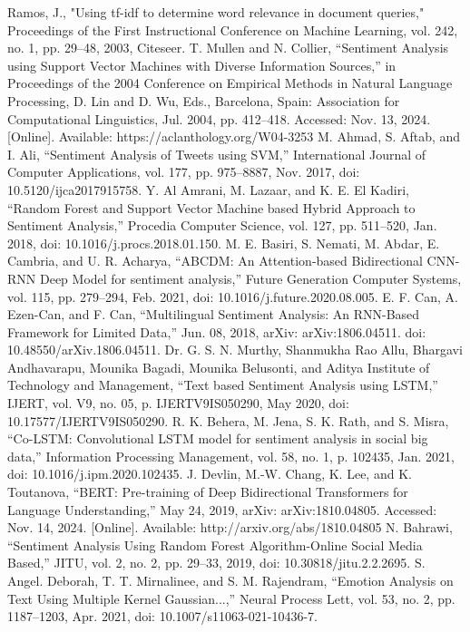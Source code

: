\documentclass{article}
\begin{document}

\begin{thebibliography}{99}  
Ramos, J., "Using tf-idf to determine word relevance in document queries," Proceedings of the First Instructional Conference on Machine Learning, vol. 242, no. 1, pp. 29–48, 2003, Citeseer.
T. Mullen and N. Collier, “Sentiment Analysis using Support Vector Machines with Diverse Information Sources,” in Proceedings of the 2004 Conference on Empirical Methods in Natural Language Processing, D. Lin and D. Wu, Eds., Barcelona, Spain: Association for Computational Linguistics, Jul. 2004, pp. 412–418. Accessed: Nov. 13, 2024. [Online]. Available: https://aclanthology.org/W04-3253
M. Ahmad, S. Aftab, and I. Ali, “Sentiment Analysis of Tweets using SVM,” International Journal of Computer Applications, vol. 177, pp. 975–8887, Nov. 2017, doi: 10.5120/ijca2017915758.
Y. Al Amrani, M. Lazaar, and K. E. El Kadiri, “Random Forest and Support Vector Machine based Hybrid Approach to Sentiment Analysis,” Procedia Computer Science, vol. 127, pp. 511–520, Jan. 2018, doi: 10.1016/j.procs.2018.01.150.
M. E. Basiri, S. Nemati, M. Abdar, E. Cambria, and U. R. Acharya, “ABCDM: An Attention-based Bidirectional CNN-RNN Deep Model for sentiment analysis,” Future Generation Computer Systems, vol. 115, pp. 279–294, Feb. 2021, doi: 10.1016/j.future.2020.08.005.
E. F. Can, A. Ezen-Can, and F. Can, “Multilingual Sentiment Analysis: An RNN-Based Framework for Limited Data,” Jun. 08, 2018, arXiv: arXiv:1806.04511. doi: 10.48550/arXiv.1806.04511.
Dr. G. S. N. Murthy, Shanmukha Rao Allu, Bhargavi Andhavarapu, Mounika Bagadi, Mounika Belusonti, and Aditya Institute of Technology and Management, “Text based Sentiment Analysis using LSTM,” IJERT, vol. V9, no. 05, p. IJERTV9IS050290, May 2020, doi: 10.17577/IJERTV9IS050290.
R. K. Behera, M. Jena, S. K. Rath, and S. Misra, “Co-LSTM: Convolutional LSTM model for sentiment analysis in social big data,” Information Processing Management, vol. 58, no. 1, p. 102435, Jan. 2021, doi: 10.1016/j.ipm.2020.102435.
J. Devlin, M.-W. Chang, K. Lee, and K. Toutanova, “BERT: Pre-training of Deep Bidirectional Transformers for Language Understanding,” May 24, 2019, arXiv: arXiv:1810.04805. Accessed: Nov. 14, 2024. [Online]. Available: http://arxiv.org/abs/1810.04805
N. Bahrawi, “Sentiment Analysis Using Random Forest Algorithm-Online Social Media Based,” JITU, vol. 2, no. 2, pp. 29–33, 2019, doi: 10.30818/jitu.2.2.2695.
S. Angel. Deborah, T. T. Mirnalinee, and S. M. Rajendram, “Emotion Analysis on Text Using Multiple Kernel Gaussian...,” Neural Process Lett, vol. 53, no. 2, pp. 1187–1203, Apr. 2021, doi: 10.1007/s11063-021-10436-7.

\end{thebibliography}
\end{document}
